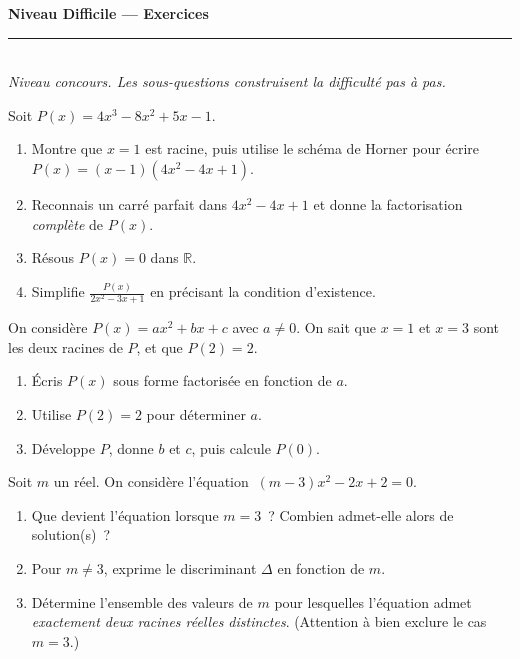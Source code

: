 \documentclass[11pt,a4paper]{article}
\newcommand{\R}{\mathbb{R}}
\newcommand{\ds}{\displaystyle}
\begin{document}
\begin{center}
{\LARGE\bfseries\color{primarydark} Niveau Difficile — Exercices}\\[2pt]
{\color{primary}\rule{0.45\textwidth}{1.2pt}}\\[3pt]
{\small\itshape Niveau concours. Les sous-questions construisent la difficulté pas à pas.}
\end{center}
\vspace{1mm}

\begin{exo}
Soit $P(x)=4x^{3}-8x^{2}+5x-1$.
\begin{enumerate}[label=\textbf{\alph*)},leftmargin=2.2em,topsep=1pt,itemsep=2pt]
  \item Montre que $x=1$ est racine, puis utilise le schéma de Horner pour écrire $P(x)=(x-1)(4x^{2}-4x+1)$.
  \item Reconnais un carré parfait dans $4x^{2}-4x+1$ et donne la factorisation \emph{complète} de $P(x)$.
  \item Résous $P(x)=0$ dans $\R$.
  \item Simplifie $\ds\frac{P(x)}{2x^{2}-3x+1}$ en précisant la condition d'existence.
\end{enumerate}
\end{exo}

\begin{exo}
On considère $P(x)=ax^{2}+bx+c$ avec $a\neq 0$. On sait que $x=1$ et $x=3$ sont les deux racines de $P$,
et que $P(2)=2$.
\begin{enumerate}[label=\textbf{\alph*)},leftmargin=2.2em,topsep=1pt,itemsep=2pt]
  \item Écris $P(x)$ sous forme factorisée en fonction de $a$.
  \item Utilise $P(2)=2$ pour déterminer $a$.
  \item Développe $P$, donne $b$ et $c$, puis calcule $P(0)$.
\end{enumerate}
\end{exo}

\begin{exo}
Soit $m$ un réel. On considère l'équation $\ (m-3)x^{2}-2x+2=0$.
\begin{enumerate}[label=\textbf{\alph*)},leftmargin=2.2em,topsep=1pt,itemsep=2pt]
  \item Que devient l'équation lorsque $m=3$~? Combien admet-elle alors de solution(s)~?
  \item Pour $m\neq 3$, exprime le discriminant $\Delta$ en fonction de $m$.
  \item Détermine l'ensemble des valeurs de $m$ pour lesquelles l'équation admet \emph{exactement deux racines réelles distinctes}. (Attention à bien exclure le cas $m=3$.)
\end{enumerate}
\end{exo}
\end{document}
